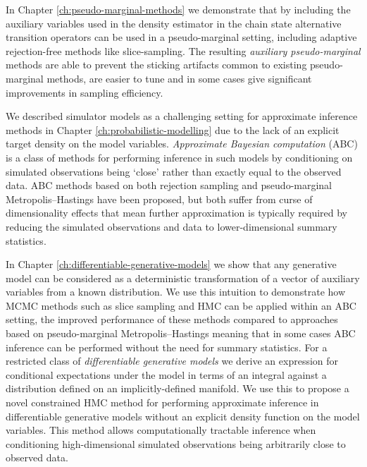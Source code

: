 In Chapter \ref{ch:pseudo-marginal-methods} we demonstrate that by including the auxiliary variables used in the density estimator in the chain state alternative transition operators can be used in a pseudo-marginal setting, including adaptive rejection-free methods like slice-sampling. The resulting \emph{auxiliary pseudo-marginal} methods are able to prevent the sticking artifacts common to existing pseudo-marginal methods, are easier to tune and in some cases give significant improvements in sampling efficiency.

We described simulator models as a challenging setting for approximate inference methods in Chapter \ref{ch:probabilistic-modelling} due to the lack of an explicit target density on the model variables. \emph{Approximate Bayesian computation}  (\ac{ABC}) is a class of methods for performing inference in such models by conditioning on simulated observations being `close' rather than exactly equal to the observed data. \ac{ABC} methods based on both rejection sampling and pseudo-marginal Metropolis--Hastings have been proposed, but both suffer from curse of dimensionality effects that mean further approximation is typically required by reducing the simulated observations and data to lower-dimensional summary statistics.

In Chapter \ref{ch:differentiable-generative-models} we show that any generative model can be considered as a deterministic transformation of a vector of auxiliary variables from a known distribution. We use this intuition to demonstrate how \ac{MCMC} methods such as slice sampling and \ac{HMC} can be applied within an \ac{ABC} setting, the improved performance of these methods compared to approaches based on pseudo-marginal Metropolis--Hastings meaning that in some cases \ac{ABC} inference can be performed without the need for summary statistics. For a restricted class of \emph{differentiable generative models} we derive an expression for conditional expectations under the model in terms of an integral against a distribution defined on an implicitly-defined manifold. We use this to propose a novel constrained \ac{HMC} method for performing approximate inference in differentiable generative models without an explicit density function on the model variables. This method allows computationally tractable inference when conditioning high-dimensional simulated observations being arbitrarily close to observed data.

